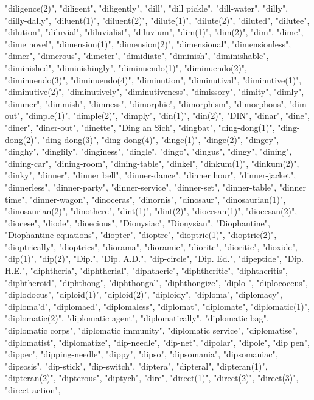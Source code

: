"diligence(2)",
"diligent",
"diligently",
"dill",
"dill pickle",
"dill-water",
"dilly",
"dilly-dally",
"diluent(1)",
"diluent(2)",
"dilute(1)",
"dilute(2)",
"diluted",
"dilutee",
"dilution",
"diluvial",
"diluvialist",
"diluvium",
"dim(1)",
"dim(2)",
"dim",
"dime",
"dime novel",
"dimension(1)",
"dimension(2)",
"dimensional",
"dimensionless",
"dimer",
"dimerous",
"dimeter",
"dimidiate",
"diminish",
"diminishable",
"diminished",
"diminishingly",
"diminuendo(1)",
"diminuendo(2)",
"diminuendo(3)",
"diminuendo(4)",
"diminution",
"diminutival",
"diminutive(1)",
"diminutive(2)",
"diminutively",
"diminutiveness",
"dimissory",
"dimity",
"dimly",
"dimmer",
"dimmish",
"dimness",
"dimorphic",
"dimorphism",
"dimorphous",
"dim-out",
"dimple(1)",
"dimple(2)",
"dimply",
"din(1)",
"din(2)",
"DIN",
"dinar",
"dine",
"diner",
"diner-out",
"dinette",
"Ding an Sich",
"dingbat",
"ding-dong(1)",
"ding-dong(2)",
"ding-dong(3)",
"ding-dong(4)",
"dinge(1)",
"dinge(2)",
"dingey",
"dinghy",
"dinglily",
"dinginess",
"dingle",
"dingo",
"dingus",
"dingy",
"dining",
"dining-car",
"dining-room",
"dining-table",
"dinkel",
"dinkum(1)",
"dinkum(2)",
"dinky",
"dinner",
"dinner bell",
"dinner-dance",
"dinner hour",
"dinner-jacket",
"dinnerless",
"dinner-party",
"dinner-service",
"dinner-set",
"dinner-table",
"dinner time",
"dinner-wagon",
"dinoceras",
"dinornis",
"dinosaur",
"dinosaurian(1)",
"dinosaurian(2)",
"dinothere",
"dint(1)",
"dint(2)",
"diocesan(1)",
"diocesan(2)",
"diocese",
"diode",
"dioecious",
"Dionysiac",
"Dionysian",
"Diophantine",
"Diophantine equations",
"diopter",
"dioptre",
"dioptric(1)",
"dioptric(2)",
"dioptrically",
"dioptrics",
"diorama",
"dioramic",
"diorite",
"dioritic",
"dioxide",
"dip(1)",
"dip(2)",
"Dip.",
"Dip. A.D.",
"dip-circle",
"Dip. Ed.",
"dipeptide",
"Dip. H.E.",
"diphtheria",
"diphtherial",
"diphtheric",
"diphtheritic",
"diphtheritis",
"diphtheroid",
"diphthong",
"diphthongal",
"diphthongize",
"diplo-",
"diplococcus",
"diplodocus",
"diploid(1)",
"diploid(2)",
"diploidy",
"diploma",
"diplomacy",
"diploma'd",
"diplomaed",
"diplomaless",
"diplomat",
"diplomate",
"diplomatic(1)",
"diplomatic(2)",
"diplomatic agent",
"diplomatically",
"diplomatic bag",
"diplomatic corps",
"diplomatic immunity",
"diplomatic service",
"diplomatise",
"diplomatist",
"diplomatize",
"dip-needle",
"dip-net",
"dipolar",
"dipole",
"dip pen",
"dipper",
"dipping-needle",
"dippy",
"dipso",
"dipsomania",
"dipsomaniac",
"dipsosis",
"dip-stick",
"dip-switch",
"diptera",
"dipteral",
"dipteran(1)",
"dipteran(2)",
"dipterous",
"diptych",
"dire",
"direct(1)",
"direct(2)",
"direct(3)",
"direct action",
